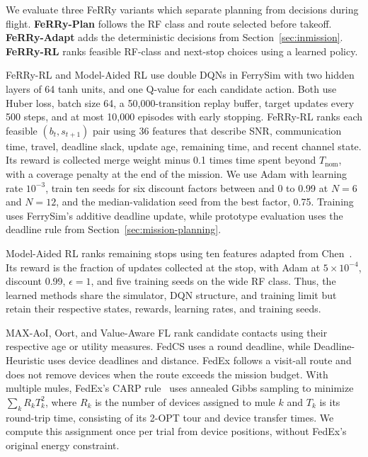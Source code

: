 \documentclass[conference]{IEEEtran}
\newcommand{\sysname}{FeRRy}
\begin{document}
We evaluate three \sysname{} variants which separate planning from decisions during flight. \textbf{\sysname{}-Plan} follows the RF class and route selected before takeoff. \textbf{\sysname{}-Adapt} adds the
deterministic decisions from Section~\ref{sec:inmission}.
\textbf{\sysname{}-RL} ranks feasible RF-class
and next-stop choices using a learned policy.

\sysname{}-RL and Model-Aided RL use double DQNs in FerrySim with two hidden
layers of 64 tanh units, and one Q-value for each candidate action. Both use Huber loss, batch size 64, a 50,000-transition replay
buffer, target updates every 500 steps, and at most 10,000 episodes with early
stopping. \sysname{}-RL ranks each feasible $(b_t,s_{t+1})$ pair using 36 features
that describe SNR, communication time, travel, deadline slack, update age, remaining time,
and recent channel state. Its reward is collected merge weight minus 0.1 times
time spent beyond \(T_{\mathrm{nom}}\), with a coverage penalty at the end of the mission. We use Adam with learning rate
\(10^{-3}\), train ten seeds for six discount factors between and 0 to 0.99 at \(N=6\) and
\(N=12\), and the median-validation seed from the best factor, 0.75. Training
uses FerrySim's additive deadline update, while prototype evaluation uses the deadline rule from
Section~\ref{sec:mission-planning}.

Model-Aided RL ranks remaining stops using ten features adapted from
Chen~\cite{chen2023model}. Its reward is the fraction of updates collected at
the stop, with Adam at \(5\times10^{-4}\), discount 0.99,
\(\epsilon=1\), and five training seeds on the wide RF class. Thus, the learned methods
share the simulator, DQN structure, and training limit but retain their
respective states, rewards, learning rates, and training seeds.

MAX-AoI, Oort, and Value-Aware FL rank candidate
contacts using their respective age or utility measures. FedCS uses a round deadline, while Deadline-Heuristic uses device
deadlines and distance. FedEx follows a visit-all route
and does not remove devices when the route exceeds the mission budget. With multiple mules, FedEx's CARP
rule~\cite{bian2025indirect} uses annealed Gibbs sampling to minimize
\(\sum_k R_kT_k^2\), where \(R_k\) is the number of devices assigned to mule
\(k\) and \(T_k\) is its round-trip time, consisting of its 2-OPT tour and
device transfer times. We compute this assignment once per trial from
device positions, without FedEx's original energy
constraint.
\end{document}
